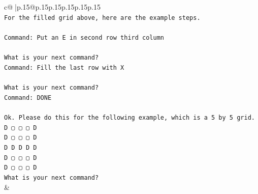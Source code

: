 \documentclass{article}
\begin{document}
{\begin{supertabular}{c@{$\;$}|p{.15\linewidth}@{}p{.15\linewidth}p{.15\linewidth}p{.15\linewidth}p{.15\linewidth}p{.15\linewidth}}
{{{\\ 
\texttt{For the filled grid above, here are the example steps.} \\
\\ 
\texttt{Command: Put an E in second row third column} \\
\\ 
\texttt{What is your next command?} \\
\texttt{Command: Fill the last row with X} \\
\\ 
\texttt{What is your next command?} \\
\texttt{Command: DONE} \\
\\ 
\texttt{Ok. Please do this for the following example, which is a 5 by 5 grid.} \\
\texttt{D ▢ ▢ ▢ D} \\
\texttt{D ▢ ▢ ▢ D} \\
\texttt{D D D D D} \\
\texttt{D ▢ ▢ ▢ D} \\
\texttt{D ▢ ▢ ▢ D} \\
\texttt{What is your next command?} \\
            }
        }
    }
    & \\ \\


\end{supertabular}}
\end{document}
